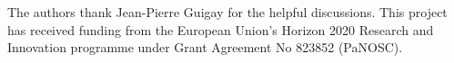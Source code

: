 \documentclass{iucr}              %
\begin{document}
The authors thank Jean-Pierre Guigay for the helpful discussions. This project has received funding from the European Union’s Horizon
2020 Research and Innovation programme under Grant Agreement No
823852 (PaNOSC).



% 





\end{document}

